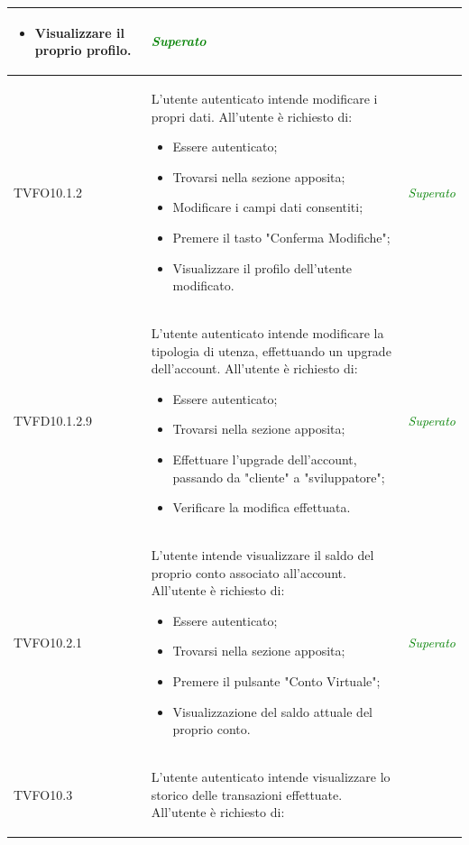 \begin{longtable}{|>{\centering\arraybackslash}p{2.3cm}|>{\centering\arraybackslash}p{7.5cm} | >{\centering\arraybackslash}p{4cm}|}
\begin{itemize}
			\item Visualizzare il proprio profilo.
		\end{itemize} & \textcolor{Green}{\textit{Superato}}\\ \hline
		\hypertarget{TVFO10.1.2}{TVFO10.1.2} & L’utente autenticato intende modificare i propri dati. All’utente è richiesto di:
		\begin{itemize}
			\item Essere autenticato;
			\item Trovarsi nella sezione apposita;
			\item Modificare i campi dati consentiti;
			\item Premere il tasto "Conferma Modifiche";
			\item Visualizzare il profilo dell’utente modificato.
		\end{itemize}
		& \textcolor{Green}{\textit{Superato}}\\ \hline
		\hypertarget{TVFD10.1.2.9}{TVFD10.1.2.9} & L’utente autenticato  intende modificare la tipologia di utenza, effettuando un upgrade dell'account. All’utente è richiesto di:
		\begin{itemize}
			\item Essere autenticato;
			\item Trovarsi nella sezione apposita;
			\item Effettuare l'upgrade dell'account, passando da "cliente" a "sviluppatore";
			\item Verificare la modifica effettuata.
		\end{itemize} & \textcolor{Green}{\textit{Superato}}\\ \hline
		\hypertarget{TVFO10.2.1}{TVFO10.2.1} & L’utente intende visualizzare il saldo del proprio conto associato all'account. All’utente è richiesto di:
		\begin{itemize}
			\item Essere autenticato;
			\item Trovarsi nella sezione apposita;
			\item Premere il pulsante "Conto Virtuale";
			\item Visualizzazione del saldo attuale del proprio conto.
		\end{itemize} & \textcolor{Green}{\textit{Superato}}\\ \hline
		\hypertarget{TVFO10.3}{TVFO10.3} & L’utente autenticato intende visualizzare lo storico delle transazioni effettuate. All’utente è richiesto di:
		\begin{itemize}

\end{itemize}
\end{longtable}
